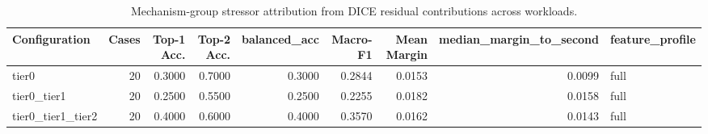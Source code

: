 \begin{table}[t]
\centering
\caption{Mechanism-group stressor attribution from DICE residual contributions across workloads.}
\label{tab:dice_stressor_diagnosis}
\footnotesize
\begin{tabular}{lrrrrrrrl}
\toprule
Configuration & Cases & Top-1 Acc. & Top-2 Acc. & balanced_acc & Macro-F1 & Mean Margin & median_margin_to_second & feature_profile \\
\midrule
tier0 & 20 & 0.3000 & 0.7000 & 0.3000 & 0.2844 & 0.0153 & 0.0099 & full \\
tier0_tier1 & 20 & 0.2500 & 0.5500 & 0.2500 & 0.2255 & 0.0182 & 0.0158 & full \\
tier0_tier1_tier2 & 20 & 0.4000 & 0.6000 & 0.4000 & 0.3570 & 0.0162 & 0.0143 & full \\
\bottomrule
\end{tabular}

\end{table}
